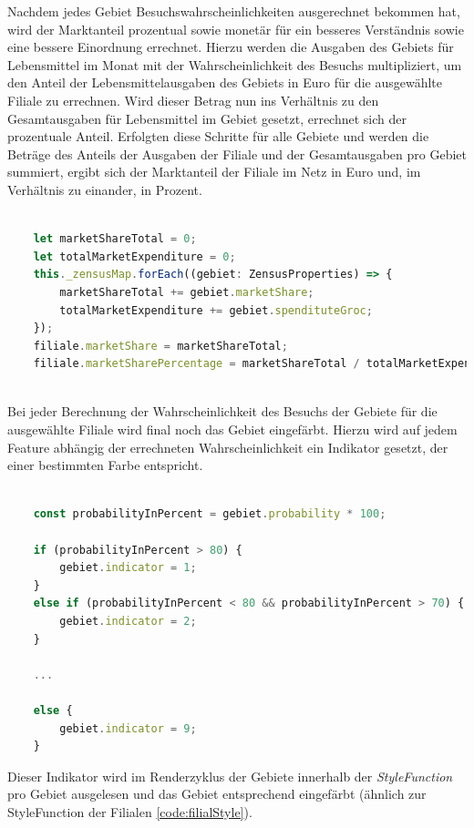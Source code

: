 Nachdem jedes Gebiet Besuchswahrscheinlichkeiten ausgerechnet bekommen hat, wird der Marktanteil prozentual sowie monetär für ein besseres Verständnis sowie eine bessere Einordnung errechnet.
Hierzu werden die Ausgaben des Gebiets für Lebensmittel im Monat mit der Wahrscheinlichkeit des Besuchs multipliziert, um den Anteil der Lebensmittelausgaben des Gebiets in Euro für die ausgewählte Filiale zu errechnen.
Wird dieser Betrag nun ins Verhältnis zu den Gesamtausgaben für Lebensmittel im Gebiet gesetzt, errechnet sich der prozentuale Anteil.
Erfolgten diese Schritte für alle Gebiete und werden die Beträge des Anteils der Ausgaben der Filiale und der Gesamtausgaben pro Gebiet summiert, ergibt sich der Marktanteil der Filiale im Netz in Euro und, im Verhältnis zu einander, in Prozent.

\begin{lstlisting}[language=JavaScript, caption={Martkanteil Berechnung}]
	
	let marketShareTotal = 0;
	let totalMarketExpenditure = 0;
	this._zensusMap.forEach((gebiet: ZensusProperties) => {
		marketShareTotal += gebiet.marketShare;
		totalMarketExpenditure += gebiet.spendituteGroc;
	});
	filiale.marketShare = marketShareTotal;
	filiale.marketSharePercentage = marketShareTotal / totalMarketExpenditure;
	
\end{lstlisting}

Bei jeder Berechnung der Wahrscheinlichkeit des Besuchs der Gebiete für die ausgewählte Filiale wird final noch das Gebiet eingefärbt.
Hierzu wird auf jedem Feature abhängig der errechneten Wahrscheinlichkeit ein Indikator gesetzt, der einer bestimmten Farbe entspricht.

\begin{lstlisting}[language=JavaScript, caption={Setzen des Einfärbeindikators}]
	
	const probabilityInPercent = gebiet.probability * 100;
	
	if (probabilityInPercent > 80) {
		gebiet.indicator = 1;
	}
	else if (probabilityInPercent < 80 && probabilityInPercent > 70) {
		gebiet.indicator = 2;
	}

	...
	
	else {
		gebiet.indicator = 9;
	}
\end{lstlisting}


Dieser Indikator wird im Renderzyklus der Gebiete innerhalb der \emph{StyleFunction} pro Gebiet ausgelesen und das Gebiet entsprechend eingefärbt (ähnlich zur StyleFunction der Filialen \ref{code:filialStyle}).

